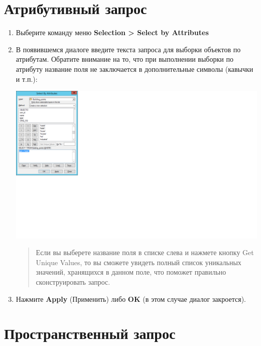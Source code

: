 \documentclass[]{book}
\theoremstyle{definition}
\theoremstyle{definition}
\theoremstyle{definition}
\theoremstyle{remark}
\begin{document}
\hypertarget{manual-select-attribute}{%
\section{Атрибутивный запрос}\label{manual-select-attribute}}

\begin{enumerate}
\def\labelenumi{\arabic{enumi}.}
\item
  Выберите команду меню \textbf{Selection \textgreater{} Select by
  Attributes}
\item
  В появившемся диалоге введите текста запроса для выборки объектов по
  атрибутам. Обратите внимание на то, что при выполнении выборки по
  атрибуту название поля не заключается в дополнительные символы
  (кавычки и т.п.):

  \includegraphics{images/Appendix/image99.png}

  \begin{quote}
  Если вы выберете название поля в списке слева и нажмете кнопку Get
  Unique Values, то вы сможете увидеть полный список уникальных
  значений, хранящихся в данном поле, что поможет правильно
  сконструировать запрос.
  \end{quote}
\item
  Нажмите \textbf{Apply} (Применить) либо \textbf{OK} (в этом случае
  диалог закроется).
\end{enumerate}

\hypertarget{manual-select-location}{%
\section{Пространственный запрос}\label{manual-select-location}}
\end{document}
